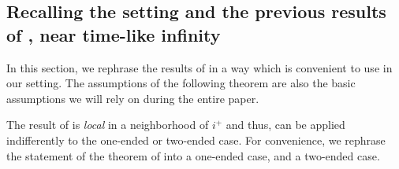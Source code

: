 \documentclass[10pt,a4paper]{article}
\theoremstyle{plain}
\theoremstyle{remark}
\theoremstyle{definition}
\theoremstyle{plain}
\theoremstyle{remark}
\theoremstyle{definition}
\numberwithin{equation}{section}
\begin{document}
\subsection{Recalling the setting and the previous results of \cite{Moi}, near time-like infinity} 

In this section, we rephrase the results of \cite{Moi} in a way which is convenient to use in our setting. The assumptions of the following theorem are also the basic assumptions we will rely on during the entire paper.

The result of \cite{Moi} is \textit{local} in a neighborhood of $i^+$ and thus, can be applied indifferently to the one-ended or two-ended case. For convenience, we rephrase the statement of the theorem of \cite{Moi} into a one-ended case, and a two-ended case. 
\end{document}
